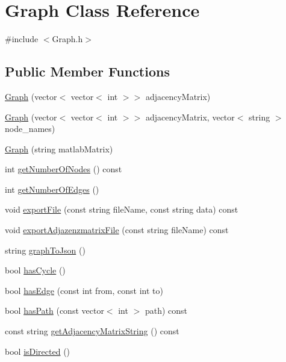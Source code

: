 \hypertarget{class_graph}{\section{Graph Class Reference}
\label{class_graph}
}


{\ttfamily \#include $<$Graph.\-h$>$}

\subsection*{Public Member Functions}
\begin{DoxyCompactItemize}
\item 
\hyperlink{class_graph_a173fa6ec1022bc0f793e3debfd19ad2c}{Graph} (vector$<$ vector$<$ int $>$$>$ adjacency\-Matrix)
\item 
\hyperlink{class_graph_a4141e4b0dc83b8637fed7a88b0abb2a8}{Graph} (vector$<$ vector$<$ int $>$$>$ adjacency\-Matrix, vector$<$ string $>$ node\-\_\-names)
\item 
\hyperlink{class_graph_afa40c944594ef9360902cfa3a754d4ef}{Graph} (string matlab\-Matrix)
\item 
int \hyperlink{class_graph_a217051ac8e8d46ca74e7837f16fbed96}{get\-Number\-Of\-Nodes} () const 
\item 
int \hyperlink{class_graph_ab532b8f903f75621e6ca3469e8dbe0bf}{get\-Number\-Of\-Edges} ()
\item 
void \hyperlink{class_graph_ac38ffcb580b1a9fa57142812aac33c46}{export\-File} (const string file\-Name, const string data) const 
\item 
void \hyperlink{class_graph_a2500973a26b28812291e2c6c142c96f4}{export\-Adjazenzmatrix\-File} (const string file\-Name) const 
\item 
string \hyperlink{class_graph_a3203a0e4a3ed223169db0b9af46cc971}{graph\-To\-Json} ()
\item 
bool \hyperlink{class_graph_a6fcbfa381804b43a67d92eed7f30e1d9}{has\-Cycle} ()
\item 
bool \hyperlink{class_graph_a0a4f1d268e549a905d0451cfdfc6f2db}{has\-Edge} (const int from, const int to)
\item 
bool \hyperlink{class_graph_abc5691276d7bab874ae07a40173d50ec}{has\-Path} (const vector$<$ int $>$ path) const 
\item 
const string \hyperlink{class_graph_ac1eae6c8e3c1b8ef39536c25d8be7fe1}{get\-Adjacency\-Matrix\-String} () const 
\item 
bool \hyperlink{class_graph_afd552af25f5c9672848693d66f27827a}{is\-Directed} ()

\end{DoxyCompactItemize}

